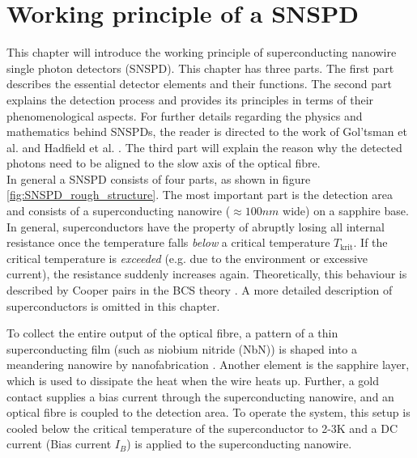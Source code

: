 \graphicspath{{/Users/maxim.re/Studium/Physik B.Sc./Semester_8_SS24/Proseminar/Figs Single Photon Detection/}}

\chapter{Working principle of a SNSPD}
\label{sec:SNSPD_working_principle}
This chapter will introduce the working principle of superconducting nanowire single photon detectors (SNSPD).
This chapter has three parts.
The first part describes the essential detector elements and their functions.
The second part explains the detection process and provides its principles in terms of their phenomenological aspects.
For further details regarding the physics and mathematics behind SNSPDs, the reader is directed
to the work of Gol’tsman et al. \cite{goltsman-2001} and Hadfield et al. \cite{natarajan-2012}.
The third part will explain the reason why the detected photons need to be aligned to the slow axis of the optical fibre.\\

In general a SNSPD consists of four parts, as shown in figure \ref{fig:SNSPD_rough_structure}.
The most important part is the detection area and consists of a superconducting nanowire ($\approx 100nm$ wide) on a sapphire base.
In general, superconductors have the property of abruptly losing all internal resistance once the temperature
falls \textit{below} a critical temperature $T_{\text{krit}}$.
If the critical temperature is \textit{exceeded} (e.g. due to the environment or excessive current),
the resistance suddenly increases again.
Theoretically, this behaviour is described by Cooper pairs in the BCS theory \cite{bardeen-1957}.
A more detailed description of superconductors is omitted in this chapter.

To collect the entire output of the optical fibre, a pattern of a
thin superconducting film (such as niobium nitride (NbN)) is shaped into a meandering nanowire by nanofabrication \cite{single-quantum-2022}.
Another element is the sapphire layer, which is used to dissipate the heat when the wire heats up.
Further, a gold contact supplies a bias current through the superconducting nanowire, and an optical fibre is coupled to the detection area.
To operate the system, this setup is cooled below the critical temperature of the superconductor to
2-3K and a DC current (Bias current $I_{B}$) is applied to the superconducting nanowire.

